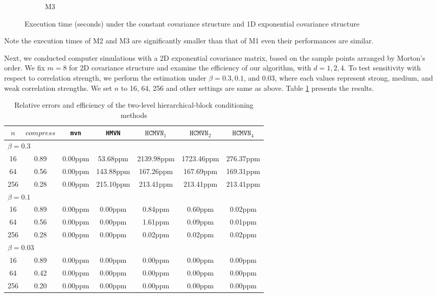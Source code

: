 \begin{figure}[!h]
\begin{subfigure}[b]{0.3\textwidth}
					\caption{M3}
			\end{subfigure}
			\caption{Execution time (seconds) under the constant covariance structure and 1D exponential covariance structure}\label{fig:table3_time}
\end{figure}	

Note the execution times of M2 and M3 are significantly smaller than that of M1 even their performances are similar.

Next, we conducted computer simulations with a 2D exponential covariance matrix, based on the sample points arranged by Morton's order. We fix $m = 8$ for 2D covariance structure and examine the efficiency of our algorithm, with $d =1,2,4$. To test sensitivity with respect to correlation strength, we perform the estimation under $\beta = 0.3, 0.1$, and 0.03, where each values represent strong, medium, and weak correlation strengths. We set $n$ to 16, 64, 256 and other settings are same as above. Table \ref{tab:table5} presents the results.

\begin{table}[h]
	\centering
	{
		\begin{tabular}{@{}ccccccc@{}}
			\toprule
			$n$ & $compress$ & \texttt{mvn} & \texttt{HMVN} & $\texttt{HCMVN}_1$ & $\texttt{HCMVN}_2$ & $\texttt{HCMVN}_4$ \\ \midrule

			
			\multicolumn{7}{l}{$\beta=0.3$} \\ \midrule
			16 & 0.89 & 0.00ppm & 53.68ppm & 2139.98ppm & 1723.46ppm & 276.37ppm \\ 
			64 & 0.56 & 0.00ppm & 143.88ppm & 167.26ppm & 167.69ppm & 169.31ppm \\ 
			256 & 0.28 & 0.00ppm & 215.10ppm & 213.41ppm & 213.41ppm & 213.41ppm \\ 
			\midrule
			\multicolumn{7}{l}{$\beta=0.1$} \\ \midrule
			16 & 0.89 & 0.00ppm & 0.00ppm & 0.84ppm & 0.60ppm & 0.02ppm \\ 
			64 & 0.56 & 0.00ppm & 0.00ppm & 1.61ppm & 0.09ppm & 0.01ppm \\ 
			256 & 0.28 & 0.00ppm & 0.00ppm & 0.02ppm & 0.02ppm & 0.02ppm \\ 
			\midrule
			\multicolumn{7}{l}{$\beta=0.03$} \\ \midrule
			16 & 0.89 & 0.00ppm & 0.00ppm & 0.00ppm & 0.00ppm & 0.00ppm \\ 
			64 & 0.42 & 0.00ppm & 0.00ppm & 0.00ppm & 0.00ppm & 0.00ppm \\ 
			256 & 0.20 & 0.00ppm & 0.00ppm & 0.00ppm & 0.00ppm & 0.00ppm \\ 
			\bottomrule
		\end{tabular}%
	}
	\caption{Relative errors and efficiency of the two-level hierarchical-block conditioning methods}
	\label{tab:table5}
\end{table}

